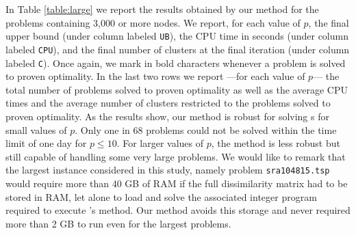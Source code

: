 \documentclass[ijoo,nonblindrev]{informs-ijoo}
\begin{document}
In Table \ref{table:large} we report the results obtained by our method for the problems containing 3,000 or more nodes. We report, for each value of $p$, the final upper bound (under column labeled \texttt{UB}), the CPU time in seconds (under column labeled \texttt{CPU}), and the final number of clusters at the final iteration (under column labeled \texttt{C}). Once again, we mark in bold characters whenever a problem is solved to proven optimality. In the last two rows we report ---for each value of $p$--- the total number of problems solved to proven optimality as well as the average CPU times and the average number of clusters restricted to the problems solved to proven optimality. As the results show, our method is robust for solving \pDP{}s for small values of $p$. Only one in 68 problems could not be solved within the time limit of one day for $p\leq 10$. For larger values of $p$, the method is less robust but still capable of handling some very large problems. We would like to remark that the largest instance considered in this study, namely problem \texttt{sra104815.tsp} would require more than 40 GB of RAM if the full dissimilarity matrix had to be stored in RAM, let alone to load and solve the associated integer program required to execute \citeauthor{Sayah2017new}'s method. Our method avoids this storage and never required more than 2 GB to run even for the largest problems.
\end{document}
